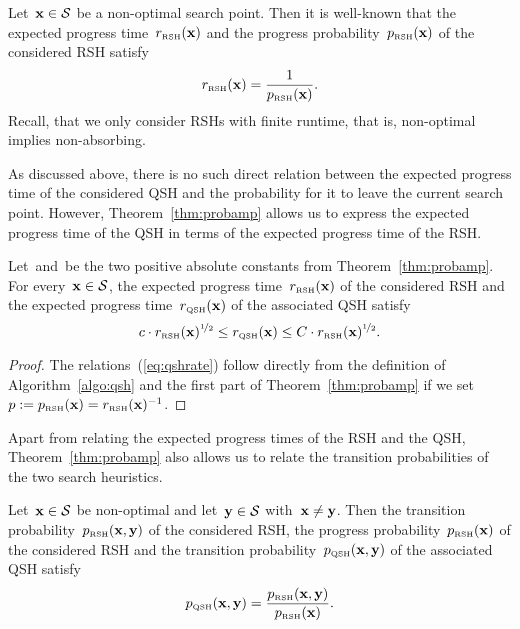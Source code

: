 \documentclass[a4paper,11pt]{article}
\begin{document}
Let~$\xvec\in\mathcal{S}$ be a non-optimal search point. Then it is well-known that the expected progress time~$r_\RSH(\xvec)$ and the progress probability~$p_\RSH(\xvec)$ of the considered RSH satisfy
\begin{equation}
\label{eq:rshrate}
r_\RSH(\xvec) = \frac{1}{p_\RSH(\xvec)}.
\end{equation}
Recall, that we only consider RSHs with finite runtime, that is, non-optimal implies non-absorbing.

As discussed above, there is no such direct relation between the expected progress time of the considered QSH and the probability for it to leave the current search point. However, Theorem~\ref{thm:probamp} allows us to express the expected progress time of the QSH in terms of the expected progress time of the RSH.

\begin{lemma}
\label{lem:qshrate}
Let~\lb and~\ub be the two positive absolute constants from Theorem~\ref{thm:probamp}. For every~$\xvec\in\mathcal{S}$, the expected progress time~$r_\RSH(\xvec)$ of the considered RSH and the expected progress time~$r_\QSH(\xvec)$ of the associated QSH satisfy
\begin{equation}
\label{eq:qshrate}
\lb\cdot r_\RSH(\xvec)^{\nicefrac{1}{2}}\le r_\QSH(\xvec) \le \ub\cdot r_\RSH(\xvec)^{\nicefrac{1}{2}}.
\end{equation}
\end{lemma}

\begin{proof}
The relations~(\ref{eq:qshrate}) follow directly from the definition of Algorithm~\ref{algo:qsh} and the first part of Theorem~\ref{thm:probamp} if we set $p:=p_\RSH(\xvec)=r_\RSH(\xvec)^{-1}$.
\end{proof}

Apart from relating the expected progress times of the RSH and the QSH, Theorem~\ref{thm:probamp} also allows us to relate the transition probabilities of the two search heuristics.

\begin{lemma}
\label{lem:transfer}
Let~$\xvec\in\mathcal{S}$ be non-optimal and let~$\yvec\in\mathcal{S}$ with~$\xvec\neq\yvec$. Then the transition probability~$p_\RSH(\xvec,\yvec)$ of the considered RSH, the progress probability~$p_\RSH(\xvec)$ of the considered RSH and the transition probability~$p_\QSH(\xvec,\yvec)$ of the associated QSH satisfy
\begin{equation}
\label{eq:transfer}
p_\QSH(\xvec,\yvec) = \frac{p_\RSH(\xvec,\yvec)}{p_\RSH(\xvec)}.
\end{equation}
\end{lemma}
\end{document}

